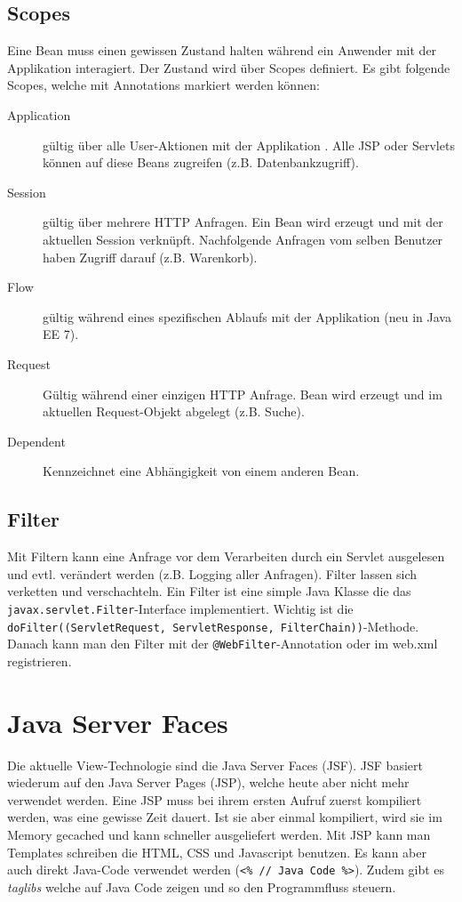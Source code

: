 \subsection{Scopes}

Eine Bean muss einen gewissen Zustand halten während ein Anwender mit der Applikation interagiert. Der Zustand wird über Scopes definiert. Es gibt folgende Scopes, welche mit Annotations markiert werden können:
\begin{description}
	\item[Application] gültig über alle User-Aktionen mit der Applikation . Alle JSP oder Servlets können auf diese Beans zugreifen (z.B. Datenbankzugriff).
	\item[Session] gültig über mehrere HTTP Anfragen. Ein Bean wird erzeugt und mit der aktuellen Session verknüpft. Nachfolgende Anfragen vom selben Benutzer haben Zugriff darauf (z.B. Warenkorb).
	\item[Flow] gültig während eines spezifischen Ablaufs mit der Applikation (neu in Java EE 7). 
	\item[Request] Gültig während einer einzigen HTTP Anfrage. Bean wird erzeugt und im aktuellen Request-Objekt abgelegt (z.B. Suche).
	\item[Dependent] Kennzeichnet eine Abhängigkeit von einem anderen Bean.
\end{description}

\subsection{Filter}

Mit Filtern kann eine Anfrage vor dem Verarbeiten durch ein Servlet ausgelesen und evtl. verändert werden (z.B. Logging aller Anfragen). Filter lassen sich verketten und verschachteln. Ein Filter ist eine simple Java Klasse die das \verb|javax.servlet.Filter|-Interface implementiert. Wichtig ist die \verb|doFilter((ServletRequest, ServletResponse, FilterChain))|-Methode. Danach kann man den Filter mit der \verb|@WebFilter|-Annotation oder im web.xml registrieren.

\section{Java Server Faces}

Die aktuelle View-Technologie sind die Java Server Faces (JSF). JSF basiert wiederum auf den Java Server Pages (JSP), welche heute aber nicht mehr verwendet werden. Eine JSP muss bei ihrem ersten Aufruf zuerst kompiliert werden, was eine gewisse Zeit dauert. Ist sie aber einmal kompiliert, wird sie im Memory gecached und kann schneller ausgeliefert werden. Mit JSP kann man Templates schreiben die HTML, CSS und Javascript benutzen. Es kann aber auch direkt Java-Code verwendet werden (\verb|<% // Java Code %>|). Zudem gibt es \textit{taglibs} welche auf Java Code zeigen und so den Programmfluss steuern.

